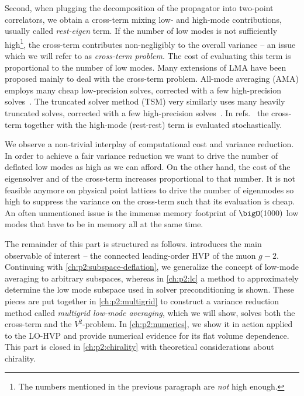 Second, when plugging the decomposition of the propagator into two-point correlators, we obtain a cross-term mixing low- and high-mode contributions, usually called \emph{rest-eigen} term.
If the number of low modes is not sufficiently high\footnote{The numbers mentioned in the previous paragraph are \emph{not} high enough.}, the cross-term contributes non-negligibly to the overall variance -- an issue which we will refer to as \emph{cross-term problem}.
The cost of evaluating this term is proportional to the number of low modes.
Many extensions of LMA have been proposed mainly to deal with the cross-term problem.
All-mode averaging (AMA) employs many cheap low-precision solves, corrected with a few high-precision solves~\cite{Blum_2012,CAA,RBC_2018,Blum_2015}.
The truncated solver method (TSM) very similarly uses many heavily truncated solves, corrected with a few high-precision solves~\cite{bmw_2017,Kuberski:2023zky}.
In refs.~\cite{fermi_2023,lynch2023} the cross-term together with the high-mode (rest-rest) term is evaluated stochastically.

We observe a non-trivial interplay of computational cost and variance reduction.
In order to achieve a fair variance reduction we want to drive the number of deflated low modes as high as we can afford.
On the other hand, the cost of the eigensolver and of the cross-term increases proportional to that number.
It is not feasible anymore on physical point lattices to drive the number of eigenmodes so high to suppress the variance on the cross-term such that its evaluation is cheap.
An often unmentioned issue is the immense memory footprint of $\bigO(1000)$ low modes that have to be in memory all at the same time.

The remainder of this part is structured as follows.
 introduces the main observable of interest -- the connected leading-order HVP of the muon $g-2$.
Continuing with \cref{ch:p2:subspace-deflation}, we generalize the concept of low-mode averaging to arbitrary subspaces, whereas in \cref{ch:p2:lc} a method to approximately determine the low mode subspace used in solver preconditioning is shown.
These pieces are put together in \cref{ch:p2:multigrid} to construct a variance reduction method called \emph{multigrid low-mode averaging}, which we will show, solves both the cross-term and the $V^{2}$-problem.
In \cref{ch:p2:numerics}, we show it in action applied to the LO-HVP and provide numerical evidence for its flat volume dependence.
This part is closed in \cref{ch:p2:chirality} with theoretical considerations about chirality.


